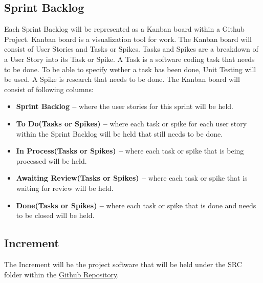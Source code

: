 \subsection{Sprint Backlog}
Each Sprint Backlog will be represented as a Kanban board within a Github Project. Kanban board is a visualization tool 
for work\cite{kanban_board}. The Kanban board will consist of User Stories and Tasks or Spikes. Tasks and Spikes are 
a breakdown of a User Story into its Task or Spike. A Task is a software coding task that needs to be done. To be able 
to specify wether a task has been done, Unit Testing will be used. A Spike is research that needs to be done. 
The Kanban board will consist of following columns:

\begin{itemize}
    \item \textbf{Sprint Backlog --} where the user stories for this sprint will be held.
    \item \textbf{To Do(Tasks or Spikes) -- } where each task or spike for each user story within the Sprint Backlog 
                                              will be held that still needs to be done.
    \item \textbf{In Process(Tasks or Spikes) -- } where each task or spike that is being processed will be held.
    \item \textbf{Awaiting Review(Tasks or Spikes) -- } where each task or spike that is waiting for review will be held.
    \item \textbf{Done(Tasks or Spikes) -- } where each task or spike that is done and needs to be closed will be held.
\end{itemize}

\subsection{Increment}
The Increment will be the project software that will be held under the SRC folder within the 
\href{https://github.com/TheRealShoxie/Interactive-Robot-Chess}{\color{blue}Github Repository}.